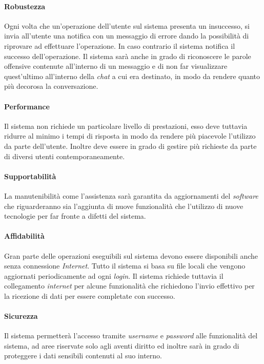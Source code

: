 \begin{enumerate}
\paragraph{Robustezza\\} 
Ogni volta che un’operazione dell’utente sul sistema presenta un insuccesso, si invia all’utente una notifica con un messaggio di errore dando la possibilità di riprovare ad effettuare l’operazione. In caso contrario il sistema notifica il successo dell’operazione. 
Il sistema sarà anche in grado di riconoscere le parole offensive contenute all’interno di un messaggio e di non far visualizzare quest’ultimo all’interno della \emph{chat} a cui era destinato, in modo da rendere quanto più decorosa la conversazione. 

\paragraph{Performance\\} 
Il sistema non richiede un particolare livello di prestazioni, esso deve tuttavia ridurre al minimo i tempi di risposta in modo da rendere più piacevole l’utilizzo da parte dell’utente. Inoltre deve essere in grado di gestire più richieste da parte di diversi utenti contemporaneamente.

\paragraph{Supportabilità\\} 
La manutenibilità come l’assistenza sarà garantita da aggiornamenti del \emph{software} che riguarderanno sia l’aggiunta di nuove funzionalità che l'utilizzo di nuove tecnologie per far fronte a difetti del sistema.

\paragraph{Affidabilità\\} 
Gran parte delle operazioni eseguibili sul sistema devono essere disponibili anche senza connessione \emph{Internet}. Tutto il sistema si basa su file locali che vengono aggiornati periodicamente ad ogni \emph{login}. Il sistema richiede tuttavia il collegamento \emph{internet} per alcune funzionalità che richiedono l’invio effettivo per la ricezione di dati per essere completate con successo.

\paragraph{Sicurezza\\} 
Il sistema permetterà l’accesso tramite \emph{username} e \emph{password} alle funzionalità del sistema, ad aree riservate solo agli aventi diritto ed inoltre sarà in grado di proteggere i dati sensibili contenuti al suo interno.


\end{enumerate}
